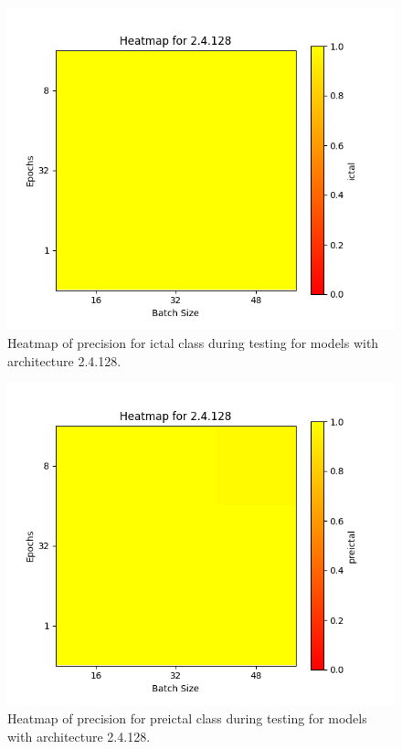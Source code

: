 \documentclass[12pt]{article}
\begin{document}
\begin{figure}[H]
\includegraphics[width=\textwidth]{heatmap_precision_ictal_2.4.128}
\centering
\caption{Heatmap of precision for ictal class during testing for models with architecture 2.4.128.}
\label{fig:time-metrics}
\end{figure}

\begin{figure}[H]
\includegraphics[width=\textwidth]{heatmap_precision_preictal_2.4.128}
\centering
\caption{Heatmap of precision for preictal class during testing for models with architecture 2.4.128.}
\label{fig:time-metrics}
\end{figure}
\end{document}
